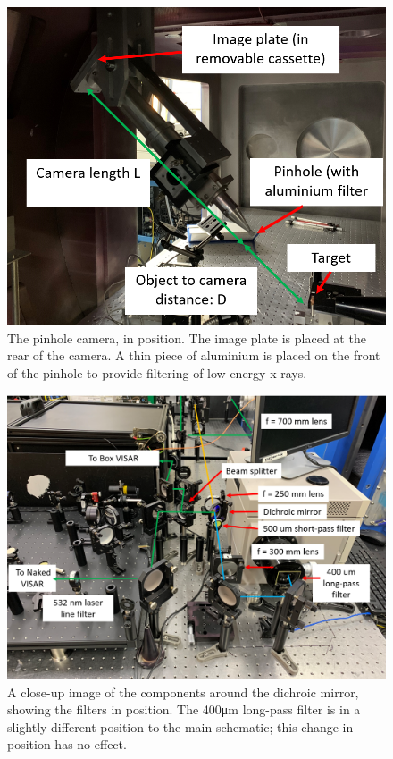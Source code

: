 \begin{figure}[ht]
\begin{centering}
\includegraphics[width=1.0\textwidth]{figures/AppendixExperiment/Pinhole.png}%
\caption{\label{fig:Appx-Pinhole} The pinhole camera, in position. The image plate is placed at the rear of the camera. A thin piece of aluminium is placed on the front of the pinhole to provide filtering of low-energy x-rays. }
\end{centering}
\end{figure}

\begin{figure}[ht]
\begin{centering}
\includegraphics[width=1.0\textwidth]{figures/AppendixExperiment/DichroicCloseUp.png}%
\caption{\label{fig:Appx-Dichroic} A close-up image of the components around the dichroic mirror, showing the filters in position. The 400\unit{\micro\meter} long-pass filter is in a slightly different position to the main schematic; this change in position has no effect.}
\end{centering}
\end{figure}

